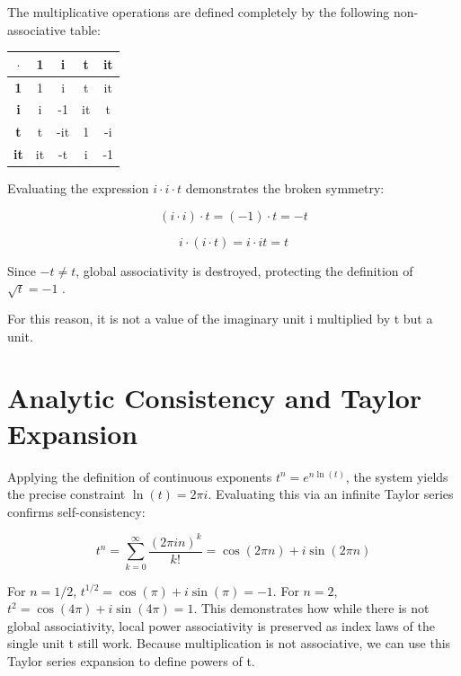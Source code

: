 \documentclass[11pt,a4paper]{article}
\begin{document}
The multiplicative operations are defined completely by the following non-associative table:


\begin{center}

\begin{tabular}{|c|c|c|c|c|}

\hline

$\cdot$ & \textbf{1} & \textbf{i} & \textbf{t} & \textbf{it} \\ \hline

\textbf{1} & 1 & i & t & it \\ \hline

\textbf{i} & i & -1 & it & t \\ \hline

\textbf{t} & t & -it & 1 & -i \\ \hline

\textbf{it} & it & -t & i & -1 \\ \hline

\end{tabular}

\end{center}


Evaluating the expression $i \cdot i \cdot t$ demonstrates the broken symmetry:

\begin{equation}
(i \cdot i) \cdot t = (-1) \cdot t = -t
\end{equation}

\begin{equation}
i \cdot (i \cdot t) = i \cdot it = t
\end{equation}

Since $-t \neq t$, global associativity is destroyed, protecting the definition of $\sqrt{t} = -1$ .

For this reason, it is not a value of the imaginary unit i multiplied by t but a unit.

\section{Analytic Consistency and Taylor Expansion}

Applying the definition of continuous exponents $t^n = e^{n \ln(t)}$, the system yields the precise constraint $\ln(t) = 2\pi i$. Evaluating this via an infinite Taylor series confirms self-consistency:

\begin{equation}
t^n = \sum_{k=0}^{\infty} \frac{(2\pi i n)^k}{k!} = \cos(2\pi n) + i \sin(2\pi n)
\end{equation}

For $n = 1/2$, $t^{1/2} = \cos(\pi) + i\sin(\pi) = -1$. For $n = 2$, $t^2 = \cos(4\pi) + i\sin(4\pi) = 1$. This demonstrates how while there is not global associativity, local power associativity is preserved as index laws of the single unit t still work. Because multiplication is not associative, we can use this Taylor series expansion to define powers of t.
\end{document}
